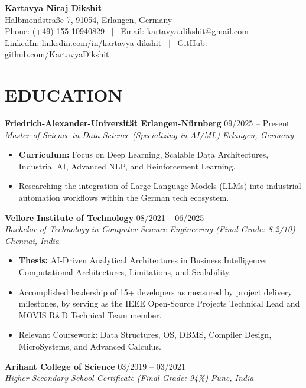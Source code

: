 \documentclass[10pt, a4paper]{article}
\newcommand{\experienceitem}[4]{
  \noindent \textbf{#1} \hfill #2 \\
  \textit{#3} \hfill \textit{#4}
}
\begin{document}
\begin{center}
    {\Huge \textbf{\color{primarycolor} Kartavya Niraj Dikshit}} \\
    \vspace{4pt}
    Halbmondstraße 7, 91054, Erlangen, Germany \\
    \vspace{2pt}
    Phone: (+49) 155 10940829 \ $|$ \ Email: \href{mailto:kartavya.dikshit@gmail.com}{kartavya.dikshit@gmail.com} \\
    LinkedIn: \href{https://www.linkedin.com/in/kartavya-dikshit}{linkedin.com/in/kartavya-dikshit} \ $|$ \ GitHub: \href{https://github.com/KartavyaDikshit}{github.com/KartavyaDikshit}
\end{center}

\section{EDUCATION}
\experienceitem{Friedrich-Alexander-Universität Erlangen-Nürnberg}{09/2025 -- Present}{Master of Science in Data Science (Specializing in AI/ML)}{Erlangen, Germany}
\begin{itemize}
    \item \textbf{Curriculum:} Focus on Deep Learning, Scalable Data Architectures, Industrial AI, Advanced NLP, and Reinforcement Learning.
    \item Researching the integration of Large Language Models (LLMs) into industrial automation workflows within the German tech ecosystem.
\end{itemize}

\experienceitem{Vellore Institute of Technology}{08/2021 -- 06/2025}{Bachelor of Technology in Computer Science Engineering (Final Grade: 8.2/10)}{Chennai, India}
\begin{itemize}
    \item \textbf{Thesis:} AI-Driven Analytical Architectures in Business Intelligence: Computational Architectures, Limitations, and Scalability.
    \item Accomplished leadership of 15+ developers as measured by project delivery milestones, by serving as the IEEE Open-Source Projects Technical Lead and MOVIS R\&D Technical Team member.
    \item Relevant Coursework: Data Structures, OS, DBMS, Compiler Design, MicroSystems, and Advanced Calculus.
\end{itemize}

\experienceitem{Arihant College of Science}{03/2019 -- 03/2021}{Higher Secondary School Certificate (Final Grade: 94\%)}{Pune, India}
\end{document}
